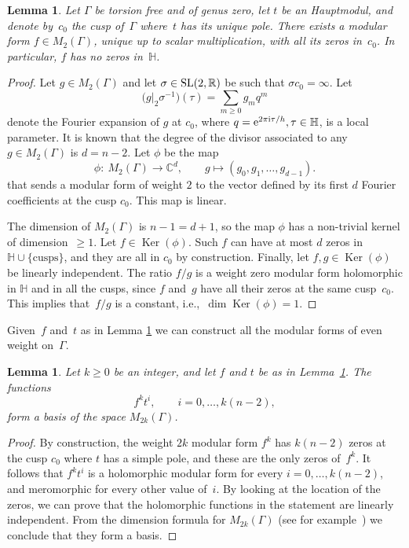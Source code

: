 \documentclass[pdftex]{sigma}
\newcommand{\C}{\mathbb{C}}
\newcommand{\R}{\mathbb{R}}
\newcommand{\Po}{\mathbb{H}}
\numberwithin{equation}{section}
\newtheorem{Lemma}[Theorem]{Lemma}
\begin{document}
\begin{Lemma}\label{thm:choice}
Let $\Gamma$ be torsion free and of genus zero, let $t$ be an Hauptmodul, and denote by~$c_0$ the cusp of~$\Gamma$ where~$t$ has its unique pole.
There exists a modular form $f\in M_2(\Gamma)$, unique up to scalar multiplication, with all its zeros in~$c_0$. In particular, $f$ has no zeros in~$\Po$.
\end{Lemma}
\begin{proof}Let $g\in M_2(\Gamma)$ and let $\sigma\in{\rm SL}(2,\R)$ be such that $\sigma{c_0}=\infty$. Let
\[
\bigl(g\bigr|_2\sigma^{-1}\bigr)(\tau)=\sum_{m\ge 0}{g_mq^m}
\]
denote the Fourier expansion of $g$ at $c_0$, where $q={\rm e}^{2\pi {\rm i}\tau/h},\tau\in\Po$, is a local parameter. It is known that the degree of the divisor associated to any $g\in M_2(\Gamma)$ is $d=n-2$.
Let $\phi$ be the map
\[
\phi\colon \ M_2(\Gamma)\to\C^d,\qquad g\mapsto (g_0,g_1,\dots,g_{d-1}).
\]
that sends a modular form of weight $2$ to the vector defined by its first $d$ Fourier coefficients at the cusp $c_0$. This map is linear.

The dimension of $M_2(\Gamma)$ is $n-1=d+1$, so the map $\phi$ has a non-trivial kernel of dimension~$\ge1$.
Let $f\in\operatorname{Ker}(\phi)$. Such $f$ can have at most $d$ zeros in ${\Po}\cup\{\text{cusps}\}$, and they are all in $c_0$ by construction.
Finally, let $f,g\in\operatorname{Ker}(\phi)$ be linearly independent. The ratio $f/g$ is a weight zero modular form holomorphic in $\Po$ and in all the cusps, since $f$ and~$g$ have all their zeros at the same cusp~$c_0$. This implies that~$f/g$ is a constant, i.e.,~$\dim\operatorname{Ker}(\phi)=1$.
\end{proof}

Given~$f$ and~$t$ as in Lemma \ref{thm:choice} we can construct all the modular forms of even weight on~$\Gamma$.
\begin{Lemma}\label{thm:dime}
Let $k\ge0$ be an integer, and let $f$ and $t$ be as in Lemma~{\rm \ref{thm:choice}}. The functions
\[
f^kt^i,\qquad i=0,\dots,k(n-2),
\]
form a basis of the space $M_{2k}(\Gamma)$.
\end{Lemma}
\begin{proof}By construction, the weight $2k$ modular form $f^k$ has $k(n-2)$ zeros at the cusp $c_0$ where $t$ has a simple pole, and these are the only zeros of~$f^k$.
It follows that $f^kt^i$ is a holomorphic modular form for every $i=0,\dots,k(n-2)$, and meromorphic for every other value of~$i$.
By looking at the location of the zeros, we can prove that the holomorphic functions in the statement are linearly independent. From the dimension formula for $M_{2k}(\Gamma)$ (see for example~\cite[Chapter~2]{Miyake}) we conclude that they form a basis.
\end{proof}
\end{document}
